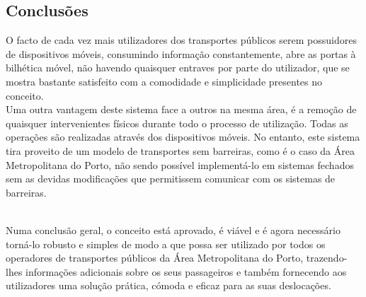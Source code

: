 \documentclass[9pt,a4paper]{extarticle}
\begin{document}
\begin{multicols}{2}
\section{Conclusões}\label{sec:conclui}

O facto de cada vez mais utilizadores dos transportes públicos serem possuidores de dispositivos móveis, consumindo informação constantemente, abre as portas à bilhética móvel, não havendo quaisquer entraves por parte do utilizador, que se mostra bastante satisfeito com a comodidade e simplicidade presentes no conceito.
\\Uma outra vantagem deste sistema face a outros na mesma área, é a remoção de quaisquer intervenientes físicos durante todo o processo de utilização. Todas as operações são realizadas através dos dispositivos móveis. No entanto, este sistema tira proveito de um modelo de transportes sem barreiras, como é o caso da Área Metropolitana do Porto, não sendo possível implementá-lo em sistemas fechados sem as devidas modificações que permitissem comunicar com os sistemas de barreiras.

~\\Numa conclusão geral, o conceito está aprovado, é viável e é agora necessário torná-lo robusto e simples de modo a que possa ser utilizado por todos os operadores de transportes públicos da Área Metropolitana do Porto, trazendo-lhes informações adicionais sobre os seus passageiros e também fornecendo aos utilizadores uma solução prática, cómoda e eficaz para as suas deslocações.




\end{multicols}
\end{document}
